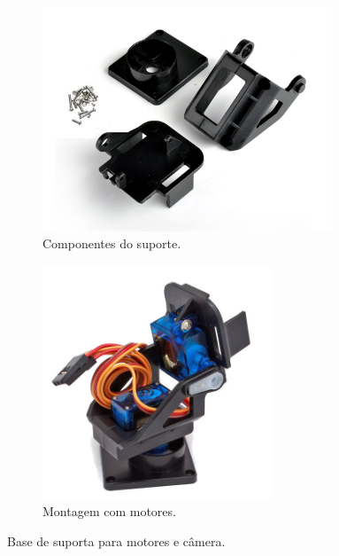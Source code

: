 \begin{figure}[H]
	\centering
	\begin{subfigure}{.5\textwidth}
		\includegraphics[width=0.95\textwidth]{figuras/base2.jpg}
		\caption{Componentes do suporte.}
		\label{fig:basedesmontada}
	\end{subfigure}%
	\begin{subfigure}{.5\textwidth}
		\includegraphics[width=0.75\textwidth]{figuras/base3.jpg}
		\caption{Montagem com motores.}
		\label{fig:basemontada}
	\end{subfigure}
	\caption{Base de suporta para motores e câmera.}
\end{figure}

